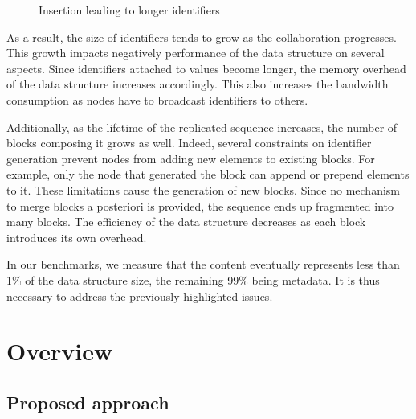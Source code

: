 \documentclass[10pt,journal,compsoc]{IEEEtran}
\let\MYoriglatexcaption\caption
\renewcommand{\caption}[2][\relax]{\MYoriglatexcaption[#2]{#2}}
\newcommand{\trm}[1]{\mathit{#1}}
\newcommand{\id}[3]{$\trm{#1}^{\trm{#2}}_{\trm{#3}}$}
\newcommand{\widthletter}{2em}
\begin{document}
\begin{figure}[t!]
    \centering
    \caption{Insertion leading to longer identifiers}
    \label{fig:example-split}
\end{figure}

As a result, the size of identifiers tends to grow as the collaboration progresses.
This growth impacts negatively performance of the data structure on several aspects.
Since identifiers attached to values become longer, the memory overhead of the data structure increases accordingly.
This also increases the bandwidth consumption as nodes have to broadcast identifiers to others.

Additionally, as the lifetime of the replicated sequence increases, the number of blocks composing it grows as well.
Indeed, several constraints on identifier generation prevent nodes from adding new elements to existing blocks.
For example, only the node that generated the block can append or prepend elements to it.
These limitations cause the generation of new blocks.
Since no mechanism to merge blocks a posteriori is provided, the sequence ends up fragmented into many blocks.
The efficiency of the data structure decreases as each block introduces its own overhead.

In our benchmarks, we measure that the content eventually represents less than 1\% of the data structure size, the remaining 99\% being metadata.
It is thus necessary to address the previously highlighted issues.

\section{Overview}
\label{sec:overview}

\subsection{Proposed approach}
\label{sec:proposition}
\end{document}
